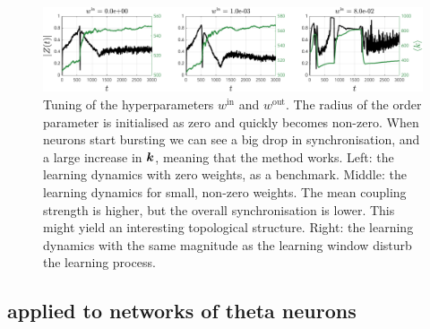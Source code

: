\begin{figure}[H]
\centering
\includegraphics[width = \textwidth]{../Figures/Learning/KempterWinWout.pdf}
\caption{Tuning of the hyperparameters $w^{\mathrm{in}}$ and $w^{\mathrm{out}}$. The radius of the order parameter is initialised as zero and quickly becomes non-zero. When neurons start bursting we can see a big drop in synchronisation, and a large increase in ${\boldsymbol{k}}$, meaning that the \STDP method works. Left: the learning dynamics with zero weights, as a benchmark. Middle: the learning dynamics for small, non-zero weights. The mean coupling strength is higher, but the overall synchronisation is lower. This might yield an interesting topological structure. Right: the learning dynamics with the same magnitude as the learning window disturb the learning process.}
\label{fig:KempterWinWout}
\end{figure}


\subsection{\STDP applied to networks of theta neurons}
